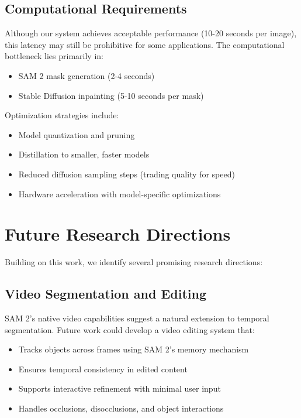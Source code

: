 \subsection{Computational Requirements}

Although our system achieves acceptable performance (10-20 seconds per image), this latency may still be prohibitive for some applications. The computational bottleneck lies primarily in:
\begin{itemize}
    \item SAM 2 mask generation (2-4 seconds)
    \item Stable Diffusion inpainting (5-10 seconds per mask)
\end{itemize}

Optimization strategies include:
\begin{itemize}
    \item Model quantization and pruning
    \item Distillation to smaller, faster models
    \item Reduced diffusion sampling steps (trading quality for speed)
    \item Hardware acceleration with model-specific optimizations
\end{itemize}

\section{Future Research Directions}

Building on this work, we identify several promising research directions:

\subsection{Video Segmentation and Editing}

SAM 2's native video capabilities suggest a natural extension to temporal segmentation. Future work could develop a video editing system that:
\begin{itemize}
    \item Tracks objects across frames using SAM 2's memory mechanism
    \item Ensures temporal consistency in edited content
    \item Supports interactive refinement with minimal user input
    \item Handles occlusions, disocclusions, and object interactions
\end{itemize}

